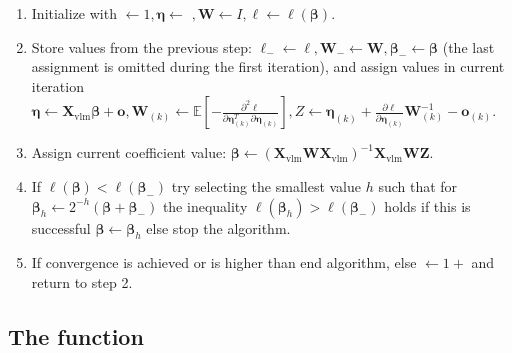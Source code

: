 \documentclass[
]{jss}
\newcommand{\1}{\mathcal{I}} \newcommand{\bx}{\boldsymbol{x}}
\begin{document}
\begin{enumerate}
    \justifying
    \item Initialize with $\leftarrow 1, \boldsymbol{\eta}\leftarrow$
    $, \boldsymbol{W}\leftarrow I, \ell\leftarrow\ell(\boldsymbol{\beta})$.
    \item Store values from the previous step: 
    $\ell_{-}\leftarrow\ell, \boldsymbol{W}_{-}\leftarrow\boldsymbol{W}, \boldsymbol{\beta}_{-}\leftarrow\boldsymbol{\beta}$ 
    (the last assignment is omitted during the first iteration), and assign values in current iteration 
    $\displaystyle\boldsymbol{\eta}\leftarrow\boldsymbol{X}_{\text{vlm}}\boldsymbol{\beta}+\boldsymbol{o}, \boldsymbol{W}_{(k)}\leftarrow\mathbb{E}\left[-\frac{\partial^{2}\ell}{\partial\boldsymbol{\eta}_{(k)}^{T}\partial\boldsymbol{\eta}_{(k)}}\right], Z\leftarrow\boldsymbol{\eta}_{(k)}+\frac{\partial\ell}{\partial\boldsymbol{\eta}_{(k)}}\boldsymbol{W}_{(k)}^{-1}-\boldsymbol{o}_{(k)}$.
    \item Assign current coefficient value: 
    $\boldsymbol{\beta}\leftarrow\left(\boldsymbol{X}_{\text{vlm}}\boldsymbol{W}\boldsymbol{X}_{\text{vlm}}\right)^{-1}\boldsymbol{X}_{\text{vlm}}\boldsymbol{W}\boldsymbol{Z}$.
    \item If $\ell(\boldsymbol{\beta})<\ell(\boldsymbol{\beta}_{-})$ try selecting the smallest value $h$ such that for
    $\boldsymbol{\beta}_{h}\leftarrow2^{-h}\left(\boldsymbol{\beta}+\boldsymbol{\beta}_{-}\right)$ the inequality $\ell(\boldsymbol{\beta}_{h})>\ell(\boldsymbol{\beta}_{-})$ 
    holds if this is successful $\boldsymbol{\beta}\leftarrow\boldsymbol{\beta}_{h}$ else stop the algorithm.
    \item If convergence is achieved or  is higher than  end algorithm, 
    else $\leftarrow 1+$ and return to step 2.
\end{enumerate}

\subsection[The]{The 
function}\label{estimatePopsizeFit-function}
\end{document}
